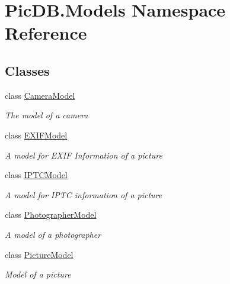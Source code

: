 \hypertarget{namespace_pic_d_b_1_1_models}{}\section{Pic\+D\+B.\+Models Namespace Reference}
\label{namespace_pic_d_b_1_1_models}
\subsection*{Classes}
\begin{DoxyCompactItemize}
\item 
class \mbox{\hyperlink{class_pic_d_b_1_1_models_1_1_camera_model}{Camera\+Model}}
\begin{DoxyCompactList}\small\item\em The model of a camera \end{DoxyCompactList}\item 
class \mbox{\hyperlink{class_pic_d_b_1_1_models_1_1_e_x_i_f_model}{E\+X\+I\+F\+Model}}
\begin{DoxyCompactList}\small\item\em A model for E\+X\+IF Information of a picture \end{DoxyCompactList}\item 
class \mbox{\hyperlink{class_pic_d_b_1_1_models_1_1_i_p_t_c_model}{I\+P\+T\+C\+Model}}
\begin{DoxyCompactList}\small\item\em A model for I\+P\+TC information of a picture \end{DoxyCompactList}\item 
class \mbox{\hyperlink{class_pic_d_b_1_1_models_1_1_photographer_model}{Photographer\+Model}}
\begin{DoxyCompactList}\small\item\em A model of a photographer \end{DoxyCompactList}\item 
class \mbox{\hyperlink{class_pic_d_b_1_1_models_1_1_picture_model}{Picture\+Model}}
\begin{DoxyCompactList}\small\item\em Model of a picture \end{DoxyCompactList}\end{DoxyCompactItemize}
